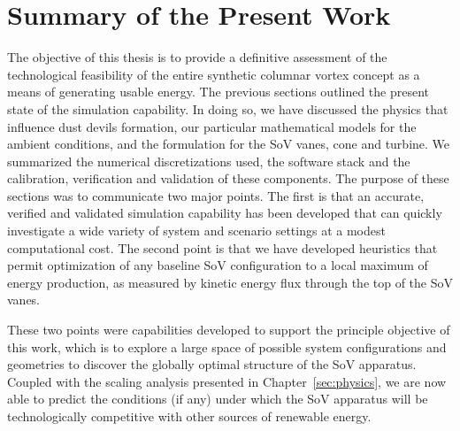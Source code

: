 \label{sec:conclusions}

%
%

%
%

\section{Summary of the Present Work}

%
%

%
%
%

The objective of this thesis is to provide a definitive assessment of
the technological feasibility of the entire synthetic columnar vortex
concept as a means of generating usable energy. The previous sections
outlined the present state of the simulation capability. In doing so, we
have discussed the physics that influence dust devils formation, our
particular mathematical models for the ambient conditions, and the
formulation for the SoV vanes, cone and turbine. We summarized the
numerical discretizations used, the software stack and the calibration,
verification and validation of these components. The purpose of these
sections was to communicate two major points. The first is that an
accurate, verified and validated simulation capability has been
developed that can quickly investigate a wide variety of system and
scenario settings at a modest computational cost. The second point is
that we have developed heuristics that permit optimization of any
baseline SoV configuration to a local maximum of energy production, as
measured by kinetic energy flux through the top of the SoV vanes.  

These two points were capabilities developed to support the principle
objective of this work, which is to explore a large space of possible
system configurations and geometries to discover the globally optimal
structure of the SoV apparatus. Coupled with the scaling analysis
presented in Chapter~\ref{sec:physics}, we are now able to predict
the conditions (if any) under which the SoV apparatus will be
technologically competitive with other sources of renewable energy.  

